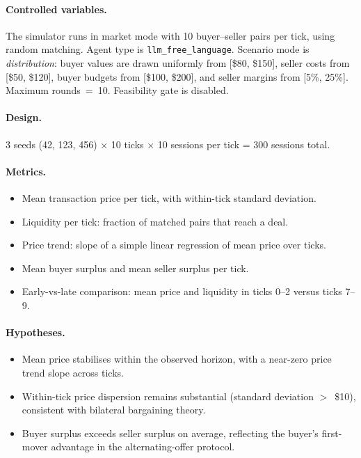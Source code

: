 \paragraph{Controlled variables.}
The simulator runs in market mode with 10 buyer--seller pairs per tick, using random matching.  Agent type is \texttt{llm\_free\_language}.  Scenario mode is \emph{distribution}: buyer values are drawn uniformly from [\$80, \$150], seller costs from [\$50, \$120], buyer budgets from [\$100, \$200], and seller margins from [5\%, 25\%].  Maximum rounds~=~10.  Feasibility gate is disabled.

\paragraph{Design.}
3 seeds (42, 123, 456) $\times$ 10 ticks $\times$ 10 sessions per tick = 300 sessions total.

\paragraph{Metrics.}
\begin{itemize}
    \item Mean transaction price per tick, with within-tick standard deviation.
    \item Liquidity per tick: fraction of matched pairs that reach a deal.
    \item Price trend: slope of a simple linear regression of mean price over ticks.
    \item Mean buyer surplus and mean seller surplus per tick.
    \item Early-vs-late comparison: mean price and liquidity in ticks 0--2 versus ticks 7--9.
\end{itemize}

\paragraph{Hypotheses.}
\begin{itemize}
    \item[\textbf{H-3a.}] Mean price stabilises within the observed horizon, with a near-zero price trend slope across ticks.
    \item[\textbf{H-3b.}] Within-tick price dispersion remains substantial (standard deviation $>$~\$10), consistent with bilateral bargaining theory.
    \item[\textbf{H-3c.}] Buyer surplus exceeds seller surplus on average, reflecting the buyer's first-mover advantage in the alternating-offer protocol.
\end{itemize}

